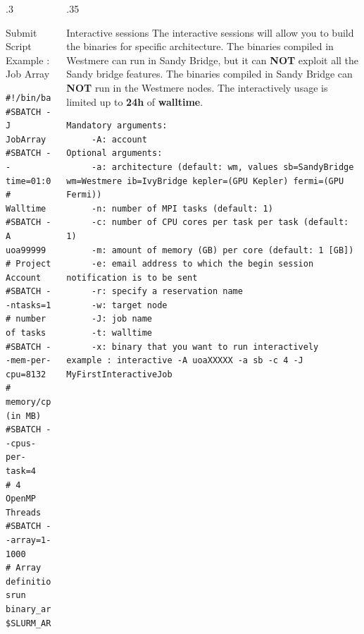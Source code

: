 \documentclass[final,t]{beamer}
\begin{document}
\begin{frame}[fragile]{}
\begin{columns}[t]
\begin{column}{.3\linewidth}
      \begin{block}{Submit Script Example : Job Array}
              \vspace*{-3ex}
        \begin{verbatim}
#!/bin/bash
#SBATCH -J JobArray
#SBATCH --time=01:00:00     # Walltime
#SBATCH -A uoa99999         # Project Account
#SBATCH --ntasks=1          # number of tasks
#SBATCH --mem-per-cpu=8132  # memory/cpu (in MB)
#SBATCH --cpus-per-task=4   # 4 OpenMP Threads
#SBATCH --array=1-1000      # Array definition
srun binary_array $SLURM_ARRAY_TASK_ID
        \end{verbatim}
                \vspace*{-4ex}
      \end{block}


    \end{column}

    
    \begin{column}{.35\linewidth}
    

      \begin{block}{Interactive sessions}
      The interactive sessions will allow you to build the binaries for specific architecture. The binaries compiled in Westmere can run in Sandy Bridge, but it can \textbf{NOT} exploit all the Sandy bridge features. The binaries compiled in Sandy Bridge can \textbf{NOT} run in the Westmere nodes. The interactively usage is limited up to \textbf{24h} of \textbf{walltime}.
      \vspace*{-0.2cm}
	 \begin{verbatim}
Mandatory arguments:
	 -A: account
Optional arguments:
	 -a: architecture (default: wm, values sb=SandyBridge wm=Westmere ib=IvyBridge kepler=(GPU Kepler) fermi=(GPU Fermi))
	 -n: number of MPI tasks (default: 1)
	 -c: number of CPU cores per task per task (default: 1)
	 -m: amount of memory (GB) per core (default: 1 [GB])
	 -e: email address to which the begin session notification is to be sent
	 -r: specify a reservation name
	 -w: target node
	 -J: job name
	 -t: walltime
	 -x: binary that you want to run interactively
example : interactive -A uoaXXXXX -a sb -c 4 -J MyFirstInteractiveJob
	\end{verbatim} 
      \end{block}



\end{column}
\end{columns}
\end{frame}
\end{document}
